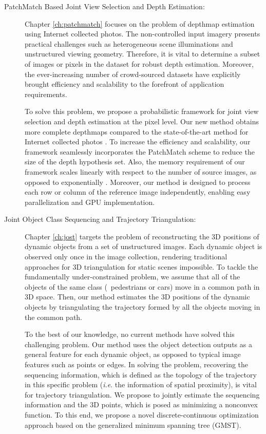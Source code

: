 \begin{description}

\item[PatchMatch Based Joint View Selection and Depth Estimation:]
Chapter \ref{ch:patchmatch} focuses on the problem of depthmap estimation using Internet collected photos. The non-controlled input imagery presents practical challenges such as heterogeneous scene illuminations and unstructured viewing geometry. Therefore, it is vital to determine a subset of images or pixels in the dataset for robust depth estimation. Moreover, the ever-increasing number of crowd-sourced datasets have explicitly brought efficiency and scalability to the forefront of application requirements.

To solve this problem, we propose a probabilistic framework for joint view selection and depth estimation at the pixel level. Our new method obtains more complete depthmaps compared to the state-of-the-art method for Internet collected photos \cite{Goesele07}. To increase the efficiency and scalability, our framework seamlessly incorporates the PatchMatch scheme \cite{patchMatchStereo1} to  reduce the size of the depth hypothesis set. Also, the memory requirement of our framework scales linearly with respect to the number of source images, as opposed to exponentially \cite{CombinedDepthOutlier}. Moreover, our method is designed to process each row or column of the reference image independently, enabling easy parallelization and GPU implementation.

\item[Joint Object Class Sequencing and Trajectory Triangulation:]
Chapter \ref{ch:jost} targets the problem of reconstructing the 3D positions of dynamic objects from a set of unstructured images. Each dynamic object is observed only once in the image collection, rendering traditional approaches for 3D triangulation for static scenes impossible. To tackle the fundamentally under-constrained problem, we assume that all of the objects of the same class (\eg~pedestrians or cars) move in a common path in 3D space. Then, our method estimates the 3D positions of the dynamic objects by triangulating the trajectory formed by all the objects moving in the common path. 

To the best of our knowledge, no current methods have solved this challenging problem. 
Our method uses the object detection outputs as a general feature for each dynamic object, as opposed to typical image features such as points or edges. In solving the problem, recovering the sequencing information, which is defined as the topology of the trajectory in this specific problem (\emph{i.e}. the information of spatial proximity), is vital for trajectory triangulation. We propose to jointly estimate the sequencing information and the 3D points, which is posed as minimizing a nonconvex function. To this end, we propose a novel discrete-continuous optimization approach based on the generalized minimum spanning tree (GMST). 


\end{description}
